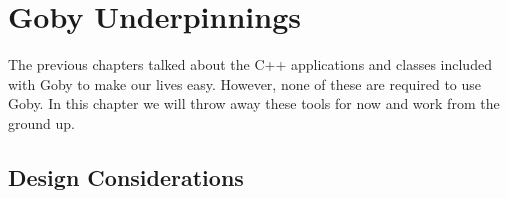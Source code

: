\chapter{Goby Underpinnings} \label{chap:underpinnings}

The previous chapters talked about the C++ applications and classes included with Goby to make our lives easy. However, none of these are required to use Goby. In this chapter we will throw away these tools for now and work from the ground up.

\section{Design Considerations}

